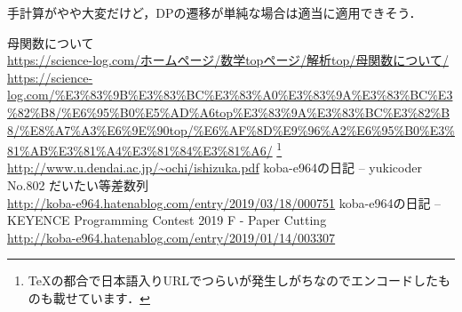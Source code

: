 \documentclass{jsarticle}
\begin{document}
手計算がやや大変だけど，DPの遷移が単純な場合は適当に適用できそう．

\begin{thebibliography}{99}
  母関数について\\
  \url{https://science-log.com/ホームページ/数学topページ/解析top/母関数について/}\\
  \url{https://science-log.com/%E3%83%9B%E3%83%BC%E3%83%A0%E3%83%9A%E3%83%BC%E3%82%B8/%E6%95%B0%E5%AD%A6top%E3%83%9A%E3%83%BC%E3%82%B8/%E8%A7%A3%E6%9E%90top/%E6%AF%8D%E9%96%A2%E6%95%B0%E3%81%AB%E3%81%A4%E3%81%84%E3%81%A6/}
    \footnote{\TeX{}の都合で日本語入りURLでつらいが発生しがちなのでエンコードしたものも載せています．}
  \url{http://www.u.dendai.ac.jp/~ochi/ishizuka.pdf}
  koba-e964の日記 -- yukicoder No.802 だいたい等差数列\\
  \url{http://koba-e964.hatenablog.com/entry/2019/03/18/000751}
  koba-e964の日記 -- KEYENCE Programming Contest 2019 F - Paper Cutting\\
  \url{http://koba-e964.hatenablog.com/entry/2019/01/14/003307}
\end{thebibliography}
\end{document}
